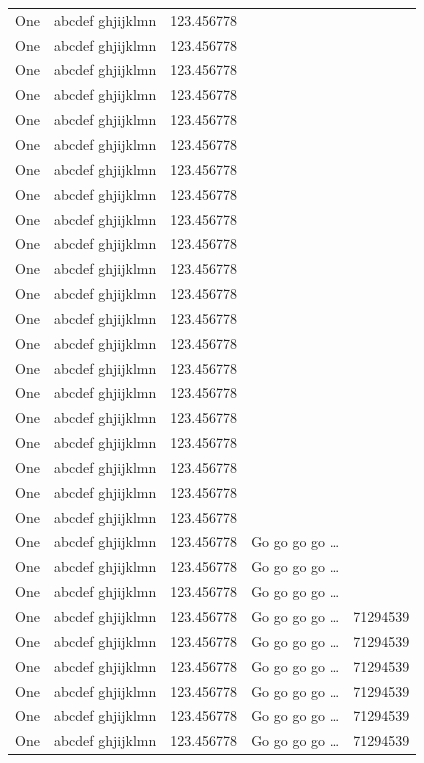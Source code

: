 \documentclass[phd,showframe]{ndsu-thesis-2022}
\begin{document}
\begin{spacing}{0.84}
\begin{xltabular}{\textwidth}{l >{\raggedright\arraybackslash}p{0.3\textwidth} X l  >{\raggedleft\arraybackslash}X @{}}
One & abcdef ghjijklmn & 123.456778 \\
One & abcdef ghjijklmn & 123.456778 \\
One & abcdef ghjijklmn & 123.456778 \\
One & abcdef ghjijklmn & 123.456778 \\
One & abcdef ghjijklmn & 123.456778 \\
One & abcdef ghjijklmn & 123.456778 \\
One & abcdef ghjijklmn & 123.456778 \\
One & abcdef ghjijklmn & 123.456778 \\
One & abcdef ghjijklmn & 123.456778 \\
One & abcdef ghjijklmn & 123.456778 \\
One & abcdef ghjijklmn & 123.456778 \\
One & abcdef ghjijklmn & 123.456778 \\
One & abcdef ghjijklmn & 123.456778 \\
One & abcdef ghjijklmn & 123.456778 \\
One & abcdef ghjijklmn & 123.456778 \\
One & abcdef ghjijklmn & 123.456778 \\
One & abcdef ghjijklmn & 123.456778 \\
One & abcdef ghjijklmn & 123.456778 \\
One & abcdef ghjijklmn & 123.456778 \\
One & abcdef ghjijklmn & 123.456778 \\
One & abcdef ghjijklmn & 123.456778 \\
One & abcdef ghjijklmn & 123.456778  & Go go go go \ldots \\
One & abcdef ghjijklmn & 123.456778  & Go go go go \ldots \\
One & abcdef ghjijklmn & 123.456778  & Go go go go \ldots \\
One & abcdef ghjijklmn & 123.456778  & Go go go go \ldots & \num{71294539}\\
One & abcdef ghjijklmn & 123.456778  & Go go go go \ldots & \num{71294539}\\
One & abcdef ghjijklmn & 123.456778  & Go go go go \ldots & \num{71294539}\\
One & abcdef ghjijklmn & 123.456778  & Go go go go \ldots & \num{71294539}\\
One & abcdef ghjijklmn & 123.456778  & Go go go go \ldots & \num{71294539}\\
One & abcdef ghjijklmn & 123.456778  & Go go go go \ldots & \num{71294539}\\

\end{xltabular}
\end{spacing}
\end{document}
